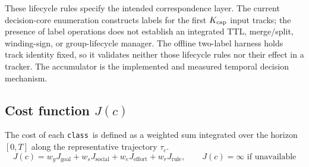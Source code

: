 \documentclass[11pt]{article}
\newcommand{\Class}{\texttt{class}}
\begin{document}
These lifecycle rules specify the intended correspondence layer. The current decision-core enumeration constructs labels for the first $K_{\rm cap}$ input tracks; the presence of label operations does not establish an integrated TTL, merge/split, winding-sign, or group-lifecycle manager. The offline two-label harness holds track identity fixed, so it validates neither those lifecycle rules nor their effect in a tracker. The accumulator is the implemented and measured temporal decision mechanism.

\FloatBarrier
\subsection{Cost function $J(c)$}

The cost of each \Class\ is defined as a weighted sum integrated over the horizon $[0,T]$ along the representative trajectory $\tau_c$.
\begin{equation}
J(c) = w_g J_{\text{goal}} + w_s J_{\text{social}} + w_e J_{\text{effort}} + w_r J_{\text{rule}}, \qquad J(c) = \infty \text{ if unavailable}
\end{equation}
\end{document}
